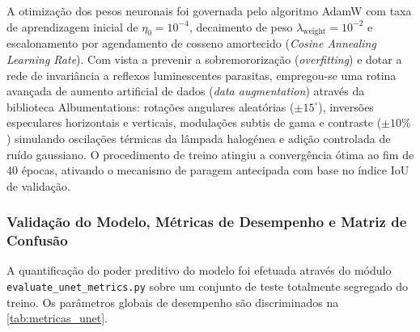 A otimização dos pesos neuronais foi governada pelo algoritmo AdamW com taxa de aprendizagem inicial de $\eta_0 = 10^{-4}$, decaimento de peso $\lambda_{\text{weight}} = 10^{-2}$ e escalonamento por agendamento de cosseno amortecido (\emph{Cosine Annealing Learning Rate}). Com vista a prevenir a sobremororização (\emph{overfitting}) e dotar a rede de invariância a reflexos luminescentes parasitas, empregou-se uma rotina avançada de aumento artificial de dados (\emph{data augmentation}) através da biblioteca Albumentations: rotações angulares aleatórias ($\pm 15^\circ$), inversões especulares horizontais e verticais, modulações subtis de gama e contraste ($\pm 10\%$) simulando oscilações térmicas da lâmpada halogénea e adição controlada de ruído gaussiano. O procedimento de treino atingiu a convergência ótima ao fim de 40 épocas, ativando o mecanismo de paragem antecipada com base no índice IoU de validação.

\subsubsection{Validação do Modelo, Métricas de Desempenho e Matriz de Confusão}
\label{subsubsec:validation_metrics}

A quantificação do poder preditivo do modelo foi efetuada através do módulo \nolinkurl{evaluate_unet_metrics.py} sobre um conjunto de teste totalmente segregado do treino. Os parâmetros globais de desempenho são discriminados na \autoref{tab:metricas_unet}.

